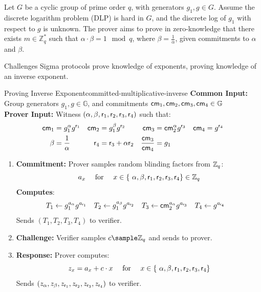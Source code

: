 Let $G$ be a cyclic group of prime order $q$, with generators $g_1, g \in G$. Assume the discrete logarithm problem (DLP) is hard in $G$, and the discrete log of $g_1$ with respect to $g$ is unknown.
The prover aims to prove in zero-knowledge that there exists $m \in \mathbb{Z}_q^*$ such that $\alpha \cdot \beta = 1 \mod q$, where $\beta = \frac{1}{\alpha}$, given commitments to $\alpha$ and $\beta$.

Challenges
Sigma protocols prove knowledge of exponents, proving knowledge of an inverse exponent. 

\begin{protocol}{Proving Inverse Exponent}{committed-multiplicative-inverse}\label{pok-committed-multiplicative-inverse}
\textbf{Common Input:} Group generators $g_1, g \in \mathbb{G}$, and commitments $\mathsf{cm}_1, \mathsf{cm}_2, \mathsf{cm}_3, \mathsf{cm}_4 \in \mathbb{G}$\\
\textbf{Prover Input:} Witness $(\alpha, \beta, \mathsf{r}_1, \mathsf{r}_2, \mathsf{r}_3, \mathsf{r}_4)$ such that:
    \begin{align*}
        \mathsf{cm}_1 &= g_1^\alpha g^{\mathsf{r}_1}     &    \mathsf{cm}_2 &= g_1^\beta g^{\mathsf{r}_2}  &   \mathsf{cm}_3 &= \mathsf{cm}_2^\alpha g^{\mathsf{r}_3} & \mathsf{cm}_4 &= g^{\mathsf{r}_4}\\
         \beta &= \frac{1}{\alpha}     &   \mathsf{r}_4 &= \mathsf{r}_3 + \alpha \mathsf{r}_2 & \frac{\mathsf{cm}_3}{\mathsf{cm}_4} &= g_1
    \end{align*}
\begin{enumerate}
    \item \textbf{Commitment:} Prover samples random blinding factors from $\mathbb{Z}_q$:
       \[
        a_x \quad \text{ for } \quad x \in \{\ \alpha, \beta, \mathsf{r}_1, \mathsf{r}_2, \mathsf{r}_3, \mathsf{r}_4\} \in \mathbb{Z}_q
        \]
    \textbf{Computes}:
    \begin{align*}
        T_1 &\gets g_1^{a_\alpha} g^{a_{\mathsf{r}_1}}  &   T_2 &\gets g_1^{a_\beta} g^{a_{\mathsf{r}_2}}     &   T_3 &\gets \mathsf{cm}_2^{a_\alpha} g^{a_{\mathsf{r}_3}} & T_4 &\gets g^{a_{\mathsf{r}_4}}
    \end{align*}
    Sends $(T_1, T_2, T_3, T_4)$ to verifier.
    
    \item \textbf{Challenge:} Verifier samples $c \sample \mathbb{Z}_q$ and sends to prover.
    
    \item \textbf{Response:} Prover computes:
    \[
    z_x = a_x + c \cdot x \quad \text{ for } \quad x \in \{\ \alpha, \beta, \mathsf{r}_1, \mathsf{r}_2, \mathsf{r}_3, \mathsf{r}_4\} 
    \]
    Sends $(z_\alpha, z_\beta, z_{\mathsf{r}_1}, z_{\mathsf{r}_2}, z_{\mathsf{r}_3}, z_{\mathsf{r}_4})$ to verifier.
    

\end{enumerate}
\end{protocol}
